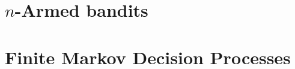 \documentclass[a4paper,12pt,twoside]{report}
\begin{document}
\chapter{$n$-Armed bandits}



\chapter{Finite Markov Decision Processes}


\end{document}
